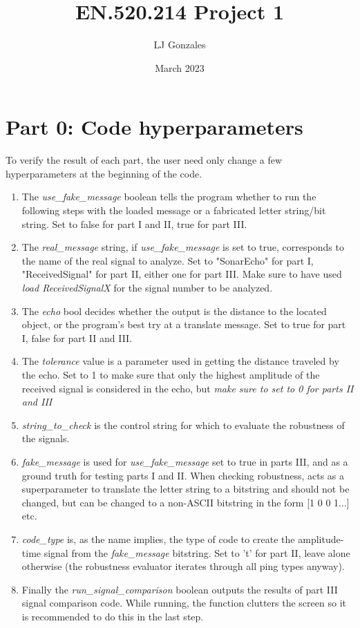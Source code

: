 \documentclass{article}
\title{EN.520.214 Project 1}
\author{LJ Gonzales}
\date{March 2023}
\begin{document}
\maketitle
\section{Part 0: Code hyperparameters}
	To verify the result of each part, the user need only change a few hyperparameters at the beginning of the code.
	\begin{enumerate}
		\item The \emph{use\_fake\_message} boolean tells the program whether to run the following steps with the loaded message or a fabricated letter string/bit string. Set to false for part I and II, true for part III.
		\item The \emph{real\_message} string, if \emph{use\_fake\_message} is set to true, corresponds to the name of the real signal to analyze. Set to "SonarEcho" for part I, "ReceivedSignal" for part II, either one for part III. Make sure to have used \emph{load ReceivedSignalX} for the signal number to be analyzed.
		\item The \emph{echo} bool decides whether the output is the distance to the located object, or the program's best try at a translate message. Set to true for part I, false for part II and III.
		\item The \emph{tolerance} value is a parameter used in getting the distance traveled by the echo. Set to 1 to make sure that only the highest amplitude of the received signal is considered in the echo, but \emph{make sure to set to 0 for parts II and III}
		\item \emph{string\_to\_check} is the control string for which to evaluate the robustness of the signals.
		\item \emph{fake\_message} is used for \emph{use\_fake\_message} set to true in parts III, and as a ground truth for testing parts I and II. When checking robustness, acts as a superparameter to translate the letter string to a bitstring and should not be changed, but can be changed to a non-ASCII bitstring in the form [1 0 0 1...] etc.
		\item \emph{code\_type} is, as the name implies, the type of code to create the amplitude-time signal from the \emph{fake\_message} bitstring. Set to 't' for part II, leave alone otherwise (the robustness evaluator iterates through all ping types anyway).
		\item Finally the \emph{run\_signal\_comparison} boolean outputs the results of part III signal comparison code. While running, the function clutters the screen so it is recommended to do this in the last step.
	\end{enumerate}
\end{document}

